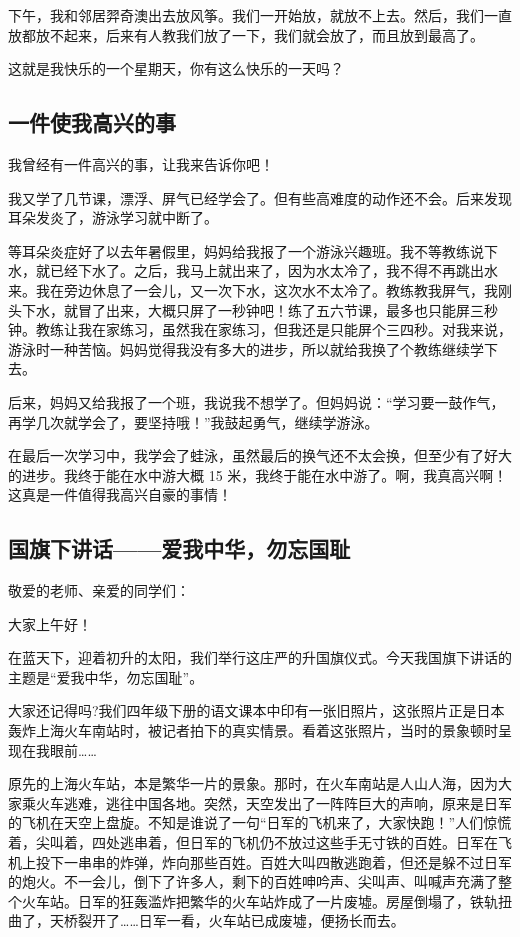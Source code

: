 \documentclass[UTF8,a4paper,titlepage,twoside,10.5pt]{article}
\begin{document}
下午，我和邻居羿奇澳出去放风筝。我们一开始放，就放不上去。然后，我们一直放都放不起来，后来有人教我们放了一下，我们就会放了，而且放到最高了。

这就是我快乐的一个星期天，你有这么快乐的一天吗？

\subsection{一件使我高兴的事}
\label{sec:org6f2bb16}

我曾经有一件高兴的事，让我来告诉你吧！

我又学了几节课，漂浮、屏气已经学会了。但有些高难度的动作还不会。后来发现耳朵发炎了，游泳学习就中断了。

等耳朵炎症好了以去年暑假里，妈妈给我报了一个游泳兴趣班。我不等教练说下水，就已经下水了。之后，我马上就出来了，因为水太冷了，我不得不再跳出水来。我在旁边休息了一会儿，又一次下水，这次水不太冷了。教练教我屏气，我刚头下水，就冒了出来，大概只屏了一秒钟吧！练了五六节课，最多也只能屏三秒钟。教练让我在家练习，虽然我在家练习，但我还是只能屏个三四秒。对我来说，游泳时一种苦恼。妈妈觉得我没有多大的进步，所以就给我换了个教练继续学下去。

后来，妈妈又给我报了一个班，我说我不想学了。但妈妈说：“学习要一鼓作气，再学几次就学会了，要坚持哦！”我鼓起勇气，继续学游泳。

在最后一次学习中，我学会了蛙泳，虽然最后的换气还不太会换，但至少有了好大的进步。我终于能在水中游大概 15 米，我终于能在水中游了。啊，我真高兴啊！这真是一件值得我高兴自豪的事情！

\subsection{国旗下讲话——爱我中华，勿忘国耻}
\label{sec:orgefc994a}

敬爱的老师、亲爱的同学们：

大家上午好！

在蓝天下，迎着初升的太阳，我们举行这庄严的升国旗仪式。今天我国旗下讲话的主题是“爱我中华，勿忘国耻”。

大家还记得吗?我们四年级下册的语文课本中印有一张旧照片，这张照片正是日本轰炸上海火车南站时，被记者拍下的真实情景。看着这张照片，当时的景象顿时呈现在我眼前……

原先的上海火车站，本是繁华一片的景象。那时，在火车南站是人山人海，因为大家乘火车逃难，逃往中国各地。突然，天空发出了一阵阵巨大的声响，原来是日军的飞机在天空上盘旋。不知是谁说了一句“日军的飞机来了，大家快跑！”人们惊慌着，尖叫着，四处逃串着，但日军的飞机仍不放过这些手无寸铁的百姓。日军在飞机上投下一串串的炸弹，炸向那些百姓。百姓大叫四散逃跑着，但还是躲不过日军的炮火。不一会儿，倒下了许多人，剩下的百姓呻吟声、尖叫声、叫喊声充满了整个火车站。日军的狂轰滥炸把繁华的火车站炸成了一片废墟。房屋倒塌了，铁轨扭曲了，天桥裂开了……日军一看，火车站已成废墟，便扬长而去。
\end{document}
